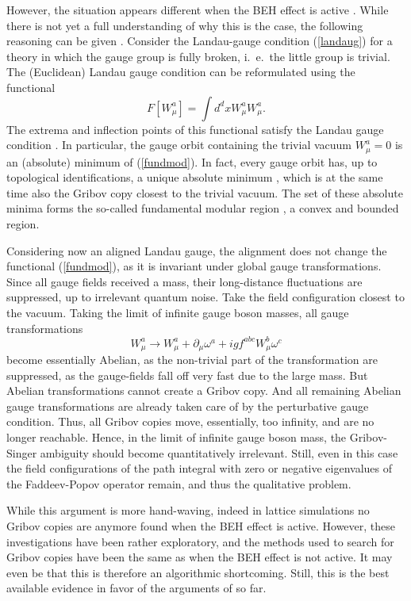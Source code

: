 \documentclass[final,12pt]{article}
\newcommand*{\no}{\noindent}
\newcommand*{\be}{\begin{equation}}
\newcommand*{\ee}{\end{equation}}
\newcommand*{\pd}{\partial}
\newcommand*{\pdm}{\pd_{\mu}}
\newcommand*{\pref}[1]{(\ref{#1})}
\newcommand*{\nn}{\nonumber}
\newcommand*{\1}{1\!\!\!\bot}
\begin{document}
However, the situation appears different when the BEH effect is active \cite{Lenz:1994tb,Lenz:2000zt,Maas:2010nc,Ilderton:2010tf,Capri:2012ah,Capri:2012cr,Capri:2013oja,Capri:2013gha,Capri:2016gut,Greensite:2004ke}. While there is not yet a full understanding of why this is the case, the following reasoning can be given \cite{Lenz:2000zt}. Consider the Landau-gauge condition \pref{landaug} for a theory in which the gauge group is fully broken, i.\ e.\ the little group is trivial. The (Euclidean) Landau gauge condition can be reformulated using the functional \cite{Maas:2011se,Zwanziger:1993dh}
\be
F[W_\mu^a]=\int d^dx W_\mu^a W_\mu^a\label{fundmod}.
\ee
\no The extrema and inflection points of this functional satisfy the Landau gauge condition \cite{Zwanziger:1993dh}. In particular, the gauge orbit containing the trivial vacuum $W_\mu^a=0$ is an (absolute) minimum of \pref{fundmod}. In fact, every gauge orbit has, up to topological identifications, a unique absolute minimum \cite{Zwanziger:1993dh,vanBaal:1997gu,vanBaal:1991zw,Dell'Antonio:1991xt}, which is at the same time also the Gribov copy closest to the trivial vacuum. The set of these absolute minima forms the so-called fundamental modular region \cite{Zwanziger:1993dh,vanBaal:1991zw,Dell'Antonio:1991xt}, a convex and bounded region.

Considering now an aligned Landau gauge, the alignment does not change the functional \pref{fundmod}, as it is invariant under global gauge transformations. Since all gauge fields received a mass, their long-distance fluctuations are suppressed, up to irrelevant quantum noise. Take the field configuration closest to the vacuum. Taking the limit of infinite gauge boson masses, all gauge transformations
\be
W_\mu^a\to W^a_\mu+\pdm\omega^a+igf^{abc}W^b_\mu\omega^c\nn
\ee
\no become essentially Abelian, as the non-trivial part of the transformation are suppressed, as the gauge-fields fall off very fast due to the large mass. But Abelian transformations cannot create a Gribov copy. And all remaining Abelian gauge transformations are already taken care of by the perturbative gauge condition. Thus, all Gribov copies move, essentially, too infinity, and are no longer reachable. Hence, in the limit of infinite gauge boson mass, the Gribov-Singer ambiguity should become quantitatively irrelevant. Still, even in this case the field configurations of the path integral with zero or negative eigenvalues of the Faddeev-Popov operator remain, and thus the qualitative problem.

While this argument is more hand-waving, indeed in lattice simulations \cite{Maas:2010nc} no Gribov copies are anymore found when the BEH effect is active. However, these investigations have been rather exploratory, and the methods used to search for Gribov copies have been the same as when the BEH effect is not active. It may even be that this is therefore an algorithmic shortcoming. Still, this is the best available evidence in favor of the arguments of \cite{Lenz:2000zt} so far.
\end{document}
